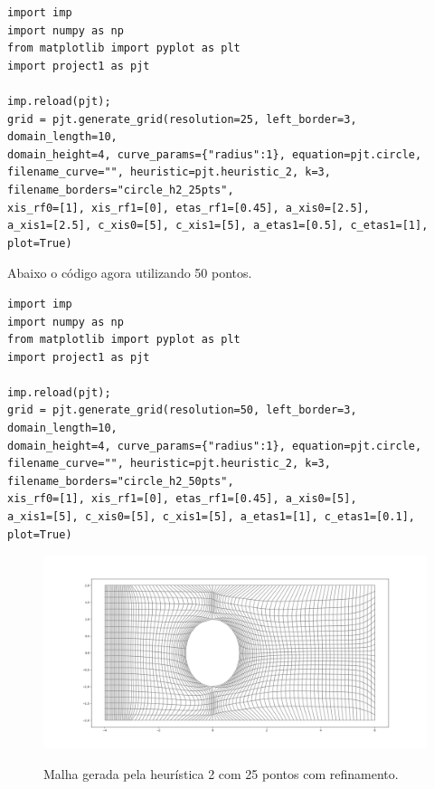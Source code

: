 \documentclass[a4paper]{article}
\begin{document}
\begin{verbatim}
import imp
import numpy as np
from matplotlib import pyplot as plt
import project1 as pjt

imp.reload(pjt);  
grid = pjt.generate_grid(resolution=25, left_border=3, domain_length=10, 
domain_height=4, curve_params={"radius":1}, equation=pjt.circle, 
filename_curve="", heuristic=pjt.heuristic_2, k=3, filename_borders="circle_h2_25pts", 
xis_rf0=[1], xis_rf1=[0], etas_rf1=[0.45], a_xis0=[2.5], 
a_xis1=[2.5], c_xis0=[5], c_xis1=[5], a_etas1=[0.5], c_etas1=[1], plot=True)
\end{verbatim}

Abaixo o código agora utilizando 50 pontos.
\begin{verbatim}
import imp
import numpy as np
from matplotlib import pyplot as plt
import project1 as pjt

imp.reload(pjt);  
grid = pjt.generate_grid(resolution=50, left_border=3, domain_length=10, 
domain_height=4, curve_params={"radius":1}, equation=pjt.circle, 
filename_curve="", heuristic=pjt.heuristic_2, k=3, filename_borders="circle_h2_50pts", 
xis_rf0=[1], xis_rf1=[0], etas_rf1=[0.45], a_xis0=[5], 
a_xis1=[5], c_xis0=[5], c_xis1=[5], a_etas1=[1], c_etas1=[0.1], plot=True)
\end{verbatim}


%



\begin{figure}[H]
	\centering
	\includegraphics[width=1.0\textwidth]{heuristica_2_25pts_refined.png}
	\label{fig:heuristic2_50pts_refined} 
	\caption[caption]{Malha gerada pela heurística 2 com 25 pontos com refinamento.}
\end{figure}
\end{document}
